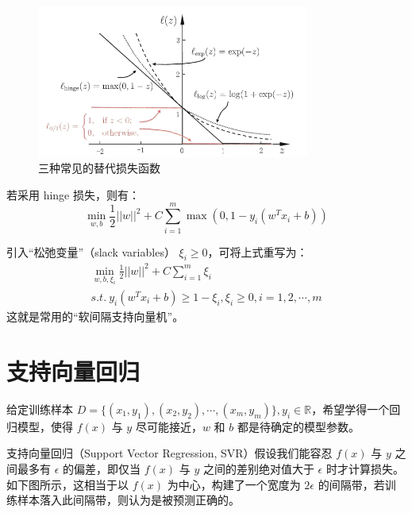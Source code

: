 \documentclass[12pt, a4paper]{article} %
\begin{document}
\begin{figure}[H]
    \centering
    \includegraphics[width=0.8\textwidth]{../img/6-6-三种常见的替代损失函数.png}
    \caption{三种常见的替代损失函数}
    \label{fig:三种常见的替代损失函数}
\end{figure}

若采用 hinge 损失，则有：
\begin{equation*}
    \min_{w, b} \frac{1}{2} ||w||^2 + C \sum_{i = 1}^{m} \max(0, 1 - y_i (w^T x_i + b))
\end{equation*}

引入“松弛变量”（slack variables） $\xi_i \ge 0$，可将上式重写为：
\begin{equation*}
    \begin{array}{*{20}{l}}
        \displaystyle \min_{w, b, \xi_i} \frac{1}{2} ||w||^2 + C \sum_{i = 1}^{m} \xi_i \\
        \displaystyle s.t. \ y_i (w^T x_i + b) \ge 1 - \xi_i, \xi_i \ge 0, i = 1, 2, \cdots, m
    \end{array}
\end{equation*}
这就是常用的“软间隔支持向量机”。

\section{支持向量回归}

给定训练样本 $D = \{(x_1, y_1), (x_2, y_2), \cdots, (x_m, y_m)\}, y_i \in \mathbb{R}$，希望学得一个回归模型，使得 $f(x)$ 与 $y$ 尽可能接近，$w$ 和 $b$ 都是待确定的模型参数。

支持向量回归（Support Vector Regression, SVR）假设我们能容忍 $f(x)$ 与 $y$ 之间最多有 $\epsilon$ 的偏差，即仅当 $f(x)$ 与 $y$ 之间的差别绝对值大于 $\epsilon$ 时才计算损失。如下图所示，这相当于以 $f(x)$ 为中心，构建了一个宽度为 $2 \epsilon$ 的间隔带，若训练样本落入此间隔带，则认为是被预测正确的。
\end{document}
